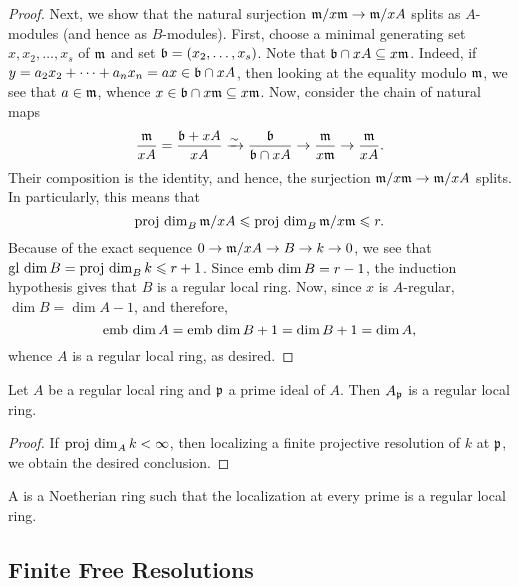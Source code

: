 \begin{proof}
    Next, we show that the natural surjection $\mathfrak{m}/x\mathfrak{m}\to \mathfrak{m}/xA$ splits as $A$-modules (and hence as $B$-modules). First, choose a minimal generating set $x, x_2,\dots,x_s$ of $\mathfrak{m}$ and set $\mathfrak{b} = (x_2,\dots,x_s)$. Note that $\mathfrak{b}\cap xA\subseteq x\mathfrak{m}$. Indeed, if $y = a_2x_2 + \dots + a_nx_n = ax\in \mathfrak{b}\cap xA$, then looking at the equality modulo $\mathfrak{m}$, we see that $a\in\mathfrak{m}$, whence $x\in\mathfrak{b}\cap x\mathfrak{m}\subseteq x\mathfrak{m}$. Now, consider the chain of natural maps 
    \begin{equation*}
        \frac{\mathfrak{m}}{xA} = \frac{\mathfrak{b} + xA}{xA}\xrightarrow{\sim}\frac{\mathfrak{b}}{\mathfrak{b}\cap xA}\to\frac{\mathfrak{m}}{x\mathfrak{m}}\to\frac{\mathfrak{m}}{xA}.
    \end{equation*}
    Their composition is the identity, and hence, the surjection $\mathfrak{m}/x\mathfrak{m}\to \mathfrak{m}/xA$ splits. In particularly, this means that 
    \begin{equation*}
        \operatorname{proj~dim}_B \mathfrak{m}/xA\leqslant\operatorname{proj~dim}_B \mathfrak{m}/x\mathfrak{m}\leqslant r.
    \end{equation*}
    Because of the exact sequence $0\to\mathfrak{m}/xA\to B\to k\to 0$, we see that $\operatorname{gl~dim} B = \operatorname{proj~dim}_B k\leqslant r + 1$. Since $\operatorname{emb~dim} B = r - 1$, the induction hypothesis gives that $B$ is a regular local ring. Now, since $x$ is $A$-regular, $\dim B = \dim A - 1$, and therefore, 
    \begin{equation*}
        \operatorname{emb~dim} A = \operatorname{emb~dim} B + 1 = \dim B + 1 = \dim A,
    \end{equation*}
    whence $A$ is a regular local ring, as desired.
\end{proof}

\begin{theorem}[Serre]
    Let $A$ be a regular local ring and $\mathfrak{p}$ a prime ideal of $A$. Then $A_{\mathfrak{p}}$ is a regular local ring.
\end{theorem}
\begin{proof}
    If $\operatorname{proj~dim}_A k < \infty$, then localizing a finite projective resolution of $k$ at $\mathfrak{p}$, we obtain the desired conclusion.
\end{proof}

\begin{definition}
    A  is a Noetherian ring such that the localization at every prime is a regular local ring.
\end{definition}

\subsection{Finite Free Resolutions}

